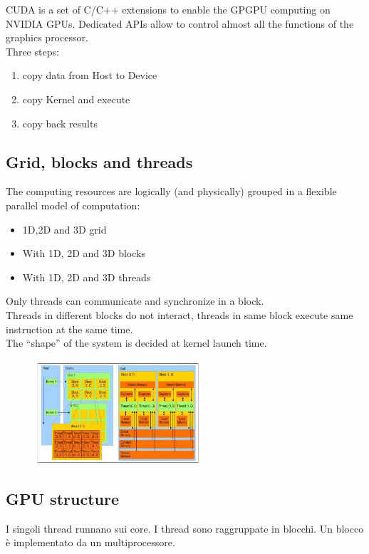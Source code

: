 CUDA is a set of C/C++ extensions to enable the GPGPU computing on
NVIDIA GPUs. Dedicated APIs allow to control almost all the functions of the graphics processor.\\
Three steps:
\begin{enumerate}
	\item copy data from Host to Device
	\item copy Kernel and execute
	\item copy back results
\end{enumerate}

\subsection{Grid, blocks and threads}

The computing resources are logically (and physically) grouped in a flexible parallel model of computation:\\
\begin{itemize}
	\item 1D,2D and 3D grid
	\item With 1D, 2D and 3D blocks
	\item With 1D, 2D and 3D threads
\end{itemize}

Only threads can communicate and synchronize in a block.\\
Threads in different blocks do not interact, threads in same block execute same instruction at the same time.\\
The “shape” of the system is decided at kernel launch time.

\begin{figure}[ht]
	\centering
	\includegraphics[width=0.55\textwidth]{figure_parallel/gbt.png}
\end{figure}
\FloatBarrier

\subsection{GPU structure}
I singoli thread runnano sui core.
I thread sono raggruppate in blocchi. Un blocco è implementato da un multiprocessore.

